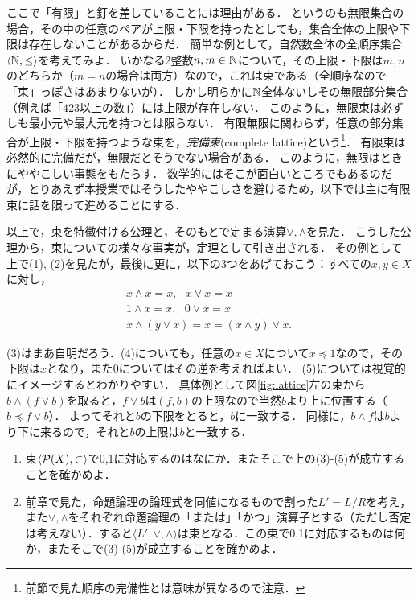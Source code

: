 \documentclass[11pt,a4paper, dvipdfmx]{jsarticle}
\begin{document}
\begin{attn}
ここで「有限」と釘を差していることには理由がある．
というのも無限集合の場合，その中の任意のペアが上限・下限を持ったとしても，集合全体の上限や下限は存在しないことがあるからだ．
簡単な例として，自然数全体の全順序集合$\langle \mathbb{N}, \leq \rangle$を考えてみよ．
いかなる2整数$n, m \in \mathbb{N}$について，その上限・下限は$m,n$のどちらか（$m=n$の場合は両方）なので，これは束である（全順序なので「束」っぽさはあまりないが）．
しかし明らかに$\mathbb{N}$全体ないしその無限部分集合（例えば「$423$以上の数」）には上限が存在しない．
このように，無限束は必ずしも最小元や最大元を持つとは限らない．
有限無限に関わらず，任意の部分集合が上限・下限を持つような束を，\emph{完備束}(complete lattice)という\footnote{前節で見た順序の完備性とは意味が異なるので注意．}．
有限束は必然的に完備だが，無限だとそうでない場合がある．
このように，無限はときにややこしい事態をもたらす．
数学的にはそこが面白いところでもあるのだが，とりあえず本授業ではそうしたややこしさを避けるため，以下では主に有限束に話を限って進めることにする． 
\end{attn}

以上で，束を特徴付ける公理と，そのもとで定まる演算$\vee, \wedge$を見た．
こうした公理から，束についての様々な事実が，定理として引き出される．
その例として上で(1), (2)を見たが，最後に更に，以下の3つをあげておこう：すべての$x, y \in X$に対し，
\begin{align}
 x \wedge x = x, \ \ \ x \vee x = x \\
 1 \wedge x = x, \ \ \ 0 \vee x = x \\
 x \wedge (y \vee x) = x = (x \wedge y) \vee x .
\end{align}

(3)はまあ自明だろう．(4)についても，任意の$x \in X$について$x \preceq 1$なので，その下限は$x$となり，また$0$についてはその逆を考えればよい．
(5)については視覚的にイメージするとわかりやすい．
具体例として図\ref{fig:lattice}左の束から$b \wedge (f \vee b)$を取ると，$f \vee b$は$(f, b)$の上限なので当然$b$より上に位置する（$b \preceq f \vee b$）．
よってそれと$b$の下限をとると，$b$に一致する．
同様に，$b \wedge f$は$b$より下に来るので，それと$b$の上限は$b$と一致する．

\begin{renshu}{}{}
\begin{enumerate} \label{logic}
    \item 束$\langle \mathcal{P}(X), \subset \rangle$で0,1に対応するのはなにか．またそこで上の(3)-(5)が成立することを確かめよ．
    \item 前章で見た，命題論理の論理式を同値になるもので割った$L'= L/R$を考え，また$\vee, \wedge$をそれぞれ命題論理の「または」「かつ」演算子とする（ただし否定は考えない）．すると$\langle L', \vee, \wedge \rangle$は束となる．この束で0,1に対応するものは何か，またそこで(3)-(5)が成立することを確かめよ．
\end{enumerate}
\end{renshu}
\end{document}
